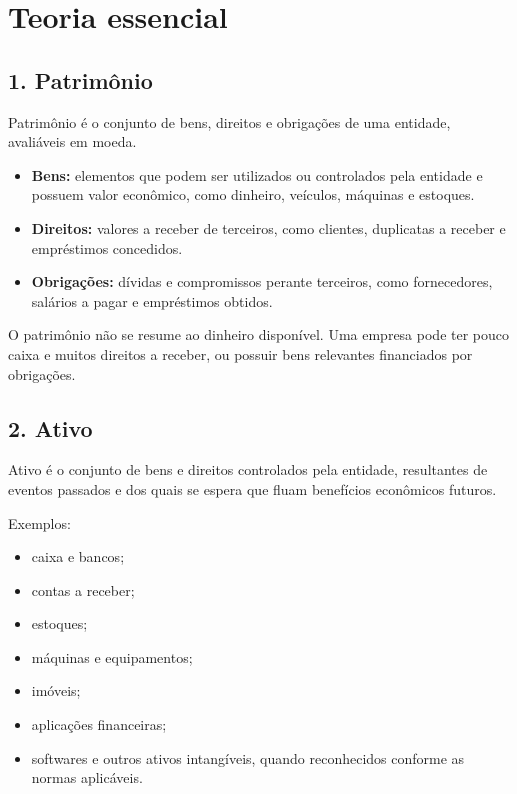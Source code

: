 \documentclass[11pt,a4paper]{article}
\begin{document}
\section*{Teoria essencial}

\subsection*{1. Patrimônio}

Patrimônio é o conjunto de bens, direitos e obrigações de uma entidade, avaliáveis em moeda.

\begin{itemize}
  \item \textbf{Bens:} elementos que podem ser utilizados ou controlados pela entidade e possuem valor econômico, como dinheiro, veículos, máquinas e estoques.
  \item \textbf{Direitos:} valores a receber de terceiros, como clientes, duplicatas a receber e empréstimos concedidos.
  \item \textbf{Obrigações:} dívidas e compromissos perante terceiros, como fornecedores, salários a pagar e empréstimos obtidos.
\end{itemize}

O patrimônio não se resume ao dinheiro disponível. Uma empresa pode ter pouco caixa e muitos direitos a receber, ou possuir bens relevantes financiados por obrigações.

\subsection*{2. Ativo}

Ativo é o conjunto de bens e direitos controlados pela entidade, resultantes de eventos passados e dos quais se espera que fluam benefícios econômicos futuros.

Exemplos:

\begin{itemize}
  \item caixa e bancos;
  \item contas a receber;
  \item estoques;
  \item máquinas e equipamentos;
  \item imóveis;
  \item aplicações financeiras;
  \item softwares e outros ativos intangíveis, quando reconhecidos conforme as normas aplicáveis.
\end{itemize}
\end{document}
